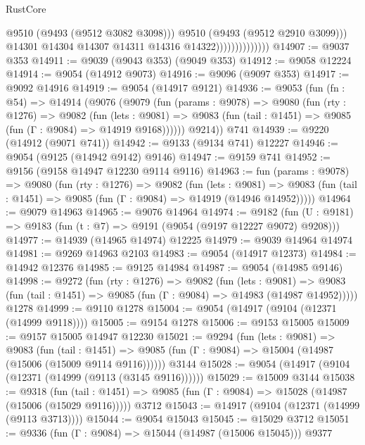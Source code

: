 \begin{lexlean}{RustCore}
\begin{coremodule}
                                    @9510
                                    (@9493 (@9512 @3082 @3098)))
                                  @9510
                                  (@9493 (@9512 @2910 @3099)))
                                @14301
                                @14304
                                @14307
                                @14311
                                @14316
                                @14322))))))))))))))
@14907 := @9037 @353
@14911 := @9039 (@9043 @353) (@9049 @353)
@14912 := @9058 @12224
@14914 := @9054 (@14912 @9073)
@14916 := @9096 (@9097 @353)
@14917 := @9092 @14916
@14919 := @9054 (@14917 @9121)
@14936 := @9053
    (fun (fn : @54) =>
    @14914
      (@9076
        (@9079
          (fun (params : @9078) =>
          @9080
            (fun (rty : @1276) =>
            @9082
              (fun (lets : @9081) =>
              @9083 (fun (tail : @1451) => @9085 (fun (Γ : @9084) => @14919 @9168))))))
        @9214))
    @741
@14939 := @9220 (@14912 (@9071 @741))
@14942 := @9133 (@9134 @741) @12227
@14946 := @9054 (@9125 (@14942 @9142) @9146)
@14947 := @9159 @741
@14952 := @9156 (@9158 @14947 @12230 @9114 @9116)
@14963 := fun (params : @9078) =>
  @9080
    (fun (rty : @1276) =>
    @9082
      (fun (lets : @9081) =>
      @9083 (fun (tail : @1451) => @9085 (fun (Γ : @9084) => @14919 (@14946 @14952)))))
@14964 := @9079 @14963
@14965 := @9076 @14964
@14974 := @9182
    (fun (U : @9181) => @9183 (fun (t : @7) => @9191 (@9054 (@9197 @12227 @9072) @9208)))
@14977 := @14939 (@14965 @14974) @12225
@14979 := @9039 @14964 @14974
@14981 := @9269 @14963 @2103
@14983 := @9054 (@14917 @12373)
@14984 := @14942 @12376
@14985 := @9125 @14984
@14987 := @9054 (@14985 @9146)
@14998 := @9272
    (fun (rty : @1276) =>
    @9082
      (fun (lets : @9081) =>
      @9083 (fun (tail : @1451) => @9085 (fun (Γ : @9084) => @14983 (@14987 @14952)))))
    @1278
@14999 := @9110 @1278
@15004 := @9054 (@14917 (@9104 (@12371 (@14999 @9118))))
@15005 := @9154 @1278
@15006 := @9153 @15005
@15009 := @9157 @15005 @14947 @12230
@15021 := @9294
    (fun (lets : @9081) =>
    @9083
      (fun (tail : @1451) =>
      @9085 (fun (Γ : @9084) => @15004 (@14987 (@15006 (@15009 @9114 @9116))))))
    @3144
@15028 := @9054 (@14917 (@9104 (@12371 (@14999 (@9113 (@3145 @9116))))))
@15029 := @15009 @3144
@15038 := @9318
    (fun (tail : @1451) => @9085 (fun (Γ : @9084) => @15028 (@14987 (@15006 (@15029 @9116)))))
    @3712
@15043 := @14917 (@9104 (@12371 (@14999 (@9113 @3713))))
@15044 := @9054 @15043
@15045 := @15029 @3712
@15051 := @9336 (fun (Γ : @9084) => @15044 (@14987 (@15006 @15045))) @9377

\end{coremodule}
\end{lexlean}
